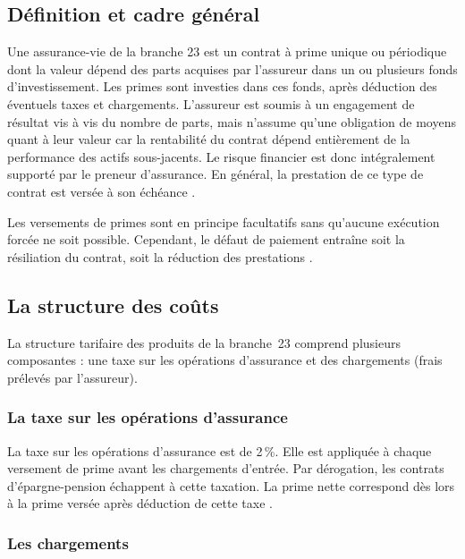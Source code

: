 ﻿\documentclass[12pt, a4paper]{article}
\begin{document}
\subsection{Définition et cadre général}

Une assurance-vie de la branche 23 est un contrat à
prime unique ou périodique
dont la valeur dépend des parts acquises
par l'assureur dans un ou plusieurs fonds 
d'investissement.
Les primes sont investies dans ces
fonds, après déduction des éventuels taxes et
chargements.
L'assureur est soumis à un engagement de résultat vis à vis du nombre de parts, mais 
n'assume qu'une obligation de moyens quant à
leur valeur car la rentabilité du contrat dépend entièrement
de la performance des actifs sous-jacents.
Le risque financier est donc intégralement
supporté par le preneur d'assurance.
En général, la prestation de ce type de contrat est versée à son échéance
\cite[p.~131-132]{Binon2016}.

Les versements de primes sont en principe facultatifs
sans qu'aucune exécution forcée ne soit possible.
Cependant, le défaut de
paiement entraîne soit la résiliation du contrat, soit la
réduction des prestations \cite[p.~333-335]{Binon2016}.

\subsection{La structure des coûts}

La structure tarifaire des produits de la branche~23 comprend
plusieurs composantes : une taxe sur les opérations d'assurance et des chargements (frais 
prélevés par l'assureur).

\subsubsection*{La taxe sur les opérations d'assurance} 

La taxe sur les opérations d'assurance est de 2\,\%. Elle est appliquée à
chaque versement de prime avant les chargements d'entrée. Par dérogation, les contrats
d'épargne-pension échappent à cette taxation. La prime nette correspond dès lors à la
prime versée après déduction de cette taxe \cite[art.~175\textsuperscript{3} et art.~176\textsuperscript{2}]{wikifin_a, cdtd1927}.

\subsubsection*{Les chargements}
\label{subsub:chargements}
\end{document}
